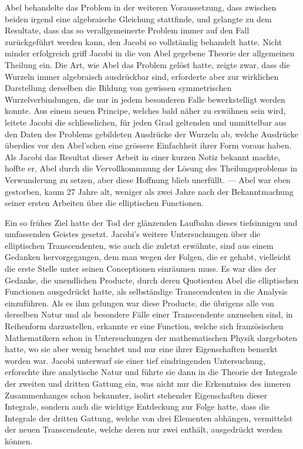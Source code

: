 \documentclass[11pt]{article}
\begin{document}
Abel behandelte das Problem in der weiteren Voraussetzung, dass zwischen beiden irgend eine algebraische Gleichung stattfinde, und gelangte zu dem Resultate, dass das so verallgemeinerte Problem immer auf den Fall zurückgeführt werden kann, den Jacobi so vollständig behandelt hatte. Nicht minder erfolgreich griff Jacobi in die von Abel gegebene Theorie der allgemeinen Theilung ein. Die Art, wie Abel das Problem gelöst hatte, zeigte zwar, dass die Wurzeln immer algebraisch ausdrückbar sind, erforderte aber zur wirklichen Darstellung derselben die Bildung von gewissen symmetrischen Wurzelverbindungen, die nur in jedem besonderen Falle bewerkstelligt werden konnte. Aus einem neuen Principe, welches bald näher zu erwähnen sein wird, leitete Jacobi die schliesslichen, für jeden Grad geltenden und unmittelbar aus den Daten des Problems gebildeten Ausdrücke der Wurzeln ab, welche Ausdrücke überdies vor den Abel’schen eine grössere Einfachheit ihrer Form voraus haben. Als Jacobi das Resultat dieser Arbeit in einer kurzen Notiz bekannt machte, hoffte er, Abel durch die Vervollkommnung der Lösung des Theilungsproblems in Verwunderung zu setzen, aber diese Hoffnung blieb unerfüllt. — Abel war eben gestorben, kaum 27 Jahre alt, weniger als zwei Jahre nach der Bekanntmachung seiner ersten Arbeiten über die elliptischen Functionen.

Ein so frühes Ziel hatte der Tod der glänzenden Laufbahn dieses tiefsinnigen und umfassenden Geistes gesetzt. Jacobi’s weitere Untersuchungen über die elliptischen Transcendenten, wie auch die zuletzt erwähnte, sind aus einem Gedanken hervorgegangen, dem man wegen der Folgen, die er gehabt, vielleicht die erste Stelle unter seinen Conceptionen einräumen muss. Es war dies der Gedanke, die unendlichen Producte, durch deren Quotienten Abel die elliptischen Functionen ausgedrückt hatte, als selbständige Transcendenten in die Analysis einzuführen. Als es ihm gelungen war diese Producte, die übrigens alle von derselben Natur und als besondere Fälle einer Transcendente anzusehen sind, in Reihenform darzustellen, erkannte er eine Function, welche sich französischen Mathematikern schon in Untersuchungen der mathematischen Physik dargeboten hatte, wo sie aber wenig beachtet und nur eine ihrer Eigenschaften bemerkt worden war. Jacobi unterwarf sie einer tief eindringenden Untersuchung, erforschte ihre analytische Natur und führte sie dann in die Theorie der Integrale der zweiten und dritten Gattung ein, was nicht nur die Erkenntniss des inneren Zusammenhanges schon bekannter, isolirt stehender Eigenschaften dieser Integrale, sondern auch die wichtige Entdeckung zur Folge hatte, dass die Integrale der dritten Gattung, welche von drei Elementen abhängen, vermittelst der neuen Transcendente, welche deren nur zwei enthält, ausgedrückt werden können.
\end{document}
